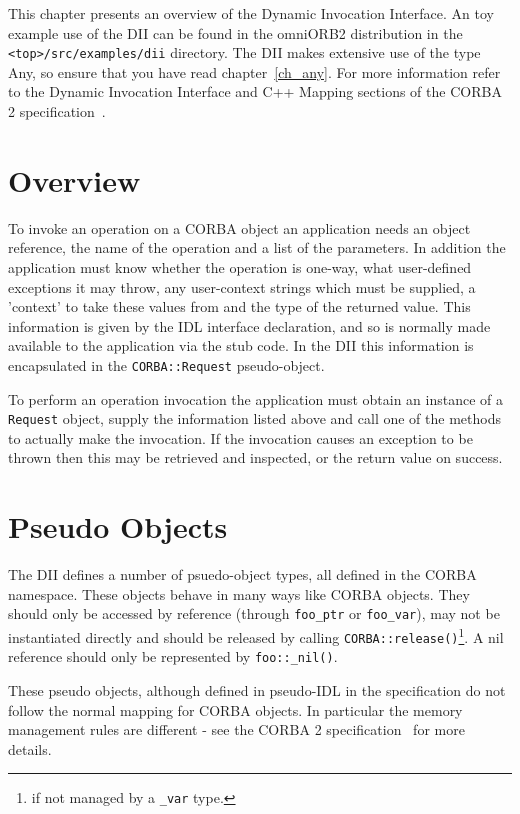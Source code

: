 \documentclass[11pt,twoside,onecolumn]{book}
\begin{document}
This chapter presents an overview of the Dynamic Invocation Interface.
An toy example use of the DII can be found in the omniORB2 distribution in
the {\tt <top>/src/examples/dii} directory.
The DII makes extensive use of the type Any, so ensure that you have read
chapter~\ref{ch_any}. For more information refer to the Dynamic Invocation
Interface and C++ Mapping sections of the CORBA 2
specification~\cite{corba2-spec}.


\section{Overview}

To invoke an operation on a CORBA object an application needs an object
reference, the name of the operation and a list of the parameters. In
addition the application must know whether the operation is one-way,
what user-defined exceptions it may throw, any user-context
strings which must be supplied, a 'context' to take these values from and the
type of the returned value. This
information is given by the IDL interface declaration, and so is normally
made available to the application via the stub code. In the DII this
information is encapsulated in the {\tt CORBA::Request} pseudo-object.

To perform an operation invocation the application must obtain an instance of
a {\tt Request} object, supply the information listed above and call one of
the methods to actually make the invocation. If the invocation causes an
exception to be thrown then this may be retrieved and inspected, or the
return value on success.


\section{Pseudo Objects}

The DII defines a number of psuedo-object types, all defined in the CORBA
namespace. These objects behave in many ways like CORBA objects. They
should only be accessed by reference (through {\tt foo\_ptr} or
{\tt foo\_var}), may not be
instantiated directly and should be released by calling
{\tt CORBA::release()}\footnote{if not managed by a {\tt \_var} type.}.
A nil reference should only be represented by {\tt foo::\_nil()}.

These pseudo objects, although defined in pseudo-IDL in the specification do
not follow the normal mapping for CORBA objects. In particular the memory
management rules are different - see the CORBA 2
specification~\cite{corba2-spec} for more details.
\end{document}
